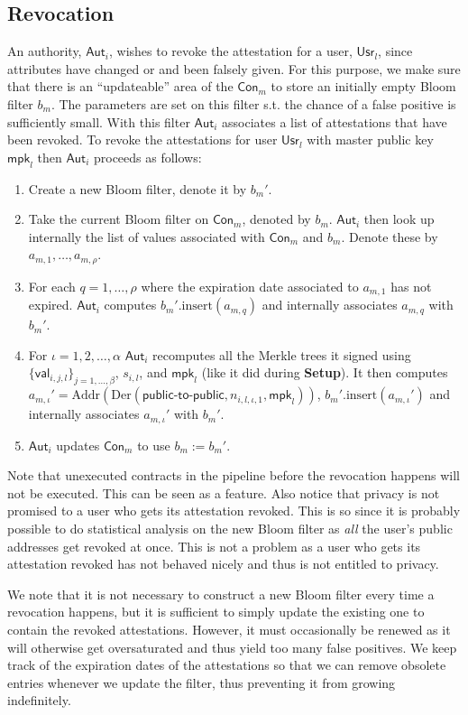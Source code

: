 \documentclass[11pt]{article} %
\newcommand{\aut}{\ensuremath{\mathsf{Aut}_i}}
\newcommand{\val}{\ensuremath{\mathsf{val}_{i,j,l}}}
\newcommand{\usr}{\ensuremath{\mathsf{Usr}_l}}
\newcommand{\con}{\ensuremath{\mathsf{Con}_m}}
\newcommand{\mpk}{\ensuremath{\mathsf{mpk}}}
\newcommand{\Der}{\ensuremath{\mathrm{Der}}}
\newcommand{\Addr}{\ensuremath{\mathrm{Addr}}}
\renewcommand{\insert}{\ensuremath{\mathrm{insert}}}
\begin{document}
\subsection{Revocation}
An authority, $\aut$, wishes to revoke the attestation for a user, $\usr$, since attributes have changed or and been falsely given. For this purpose, we make sure that there is an ``updateable'' area of the $\con$ to store an initially empty Bloom filter $b_m$. The parameters are set on this filter s.t. the chance of a false positive is sufficiently small. With this filter $\aut$ associates a list of attestations that have been revoked. To revoke the attestations for user $\usr$ with master public key $\mpk_l$ then $\aut$ proceeds as follows:
\begin{enumerate}
	\item Create a new Bloom filter, denote it by $b_m'$.
	\item Take the current Bloom filter on $\con$, denoted by $b_m$. $\aut$ then look up internally the list of values associated with $\con$ and $b_m$. Denote these by $a_{m, 1}, \dots, a_{m, \rho}$.
	\item For each $q=1, \dots, \rho$ where the expiration date associated to $a_{m,1}$ has not expired. $\aut$ computes $b_m'.\insert(a_{m, q})$ and internally associates $a_{m,q}$ with $b_m'$.
	\item \sloppy For $\iota=1, 2, \dots, \alpha$ $\aut$ recomputes all the Merkle trees it signed using $\{\val\}_{j=1, \dots, \beta}$, $s_{i, l}$, and $\mpk_l$ (like it did during \textbf{Setup}). It then computes $a_{m, \iota}' = \Addr\left(\Der\left(\mathsf{public}\mbox{-}\mathsf{to}\mbox{-}\mathsf{public}, n_{i,l,\iota, 1}, \mpk_l\right)\right)$, $b_m'.\insert(a_{m, \iota}')$ and internally associates $a_{m,\iota}'$ with $b_m'$.
	\item $\aut$ updates $\con$ to use $b_m:=b_m'$.
\end{enumerate}
Note that unexecuted contracts in the pipeline before the revocation happens will not be executed. This can be seen as a feature. Also notice that privacy is not promised to a user who gets its attestation revoked. This is so since it is probably possible to do statistical analysis on the new Bloom filter as \emph{all} the user's public addresses get revoked at once. This is not a problem as a user who gets its attestation revoked has not behaved nicely and thus is not entitled to privacy.

We note that it is not necessary to construct a new Bloom filter every time a revocation happens, but it is sufficient to simply update the existing one to contain the revoked attestations. However, it must occasionally be renewed as it will otherwise get oversaturated and thus yield too many false positives. We keep track of the expiration dates of the attestations so that we can remove obsolete entries whenever we update the filter, thus preventing it from growing indefinitely.
\end{document}
